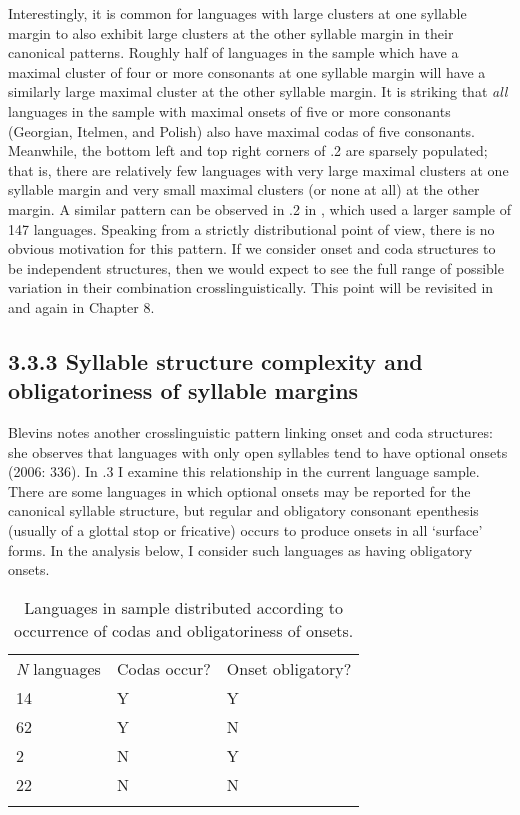   Interestingly, it is common for languages with large clusters at one syllable margin to also exhibit large clusters at the other syllable margin in their canonical patterns. Roughly half of languages in the sample which have a maximal cluster of four or more consonants at one syllable margin will have a similarly large maximal cluster at the other syllable margin. It is striking that \textit{all} languages in the sample with maximal onsets of five or more consonants (Georgian, Itelmen, and Polish) also have maximal codas of five consonants. Meanwhile, the bottom left and top right corners of .2 are sparsely populated; that is, there are relatively few languages with very large maximal clusters at one syllable margin and very small maximal clusters (or none at all) at the other margin. A similar pattern can be observed in .2 in , which used a larger sample of 147 languages. Speaking from a strictly distributional point of view, there is no obvious motivation for this pattern. If we consider onset and coda structures to be independent structures, then we would expect to see the full range of possible variation in their combination crosslinguistically. This point will be revisited in  and again in Chapter 8.


\subsection{3.3.3 Syllable structure complexity and obligatoriness of syllable margins}

  Blevins notes another crosslinguistic pattern linking onset and coda structures: she observes that languages with only open syllables tend to have optional onsets (2006: 336). In .3 I examine this relationship in the current language sample. There are some languages in which optional onsets may be reported for the canonical syllable structure, but regular and obligatory consonant epenthesis (usually of a glottal stop or fricative) occurs to produce onsets in all ‘surface’ forms. In the analysis below, I consider such languages as having obligatory onsets.






\begin{table}
\begin{tabularx}{\textwidth}{XXX}
\lsptoprule

 \textit{N} languages & Codas occur? & Onset obligatory?\\
 14 & Y & Y\\
 62 & Y & N\\
 2 & N & Y\\
 22 & N & N\\
\lspbottomrule
\end{tabularx}
\caption{\label{3.3}Languages in sample distributed according to occurrence of codas and obligatoriness of onsets.}
\end{table}




